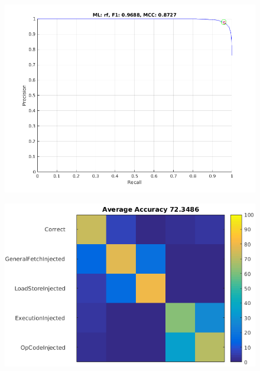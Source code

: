 \begin{figure}[t]
\begin{center}
   \includegraphics[width=0.95\linewidth]{./figures/siaf.png}
\end{center}
   \caption{}
\label{fig:siaf}
\end{figure}

\begin{figure}[t]
\begin{center}
   \includegraphics[width=0.95\linewidth]{./figures/siaf_multi.png}
\end{center}
   \caption{}
\label{fig:siaf-multi}
\end{figure}

